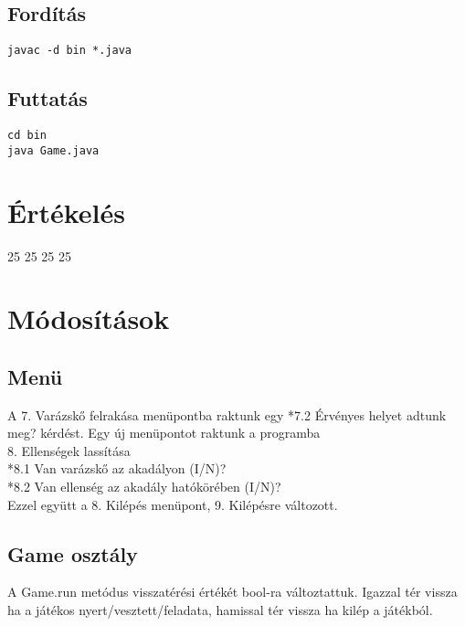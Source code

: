 \subsection{Fordítás}

\lstset{escapeinside=`', xleftmargin=10pt, frame=single, basicstyle=\ttfamily\footnotesize, language=sh}
\begin{lstlisting}
javac -d bin *.java
\end{lstlisting}

\subsection{Futtatás}

\lstset{escapeinside=`', xleftmargin=10pt, frame=single, basicstyle=\ttfamily\footnotesize, language=sh}
\begin{lstlisting}
cd bin
java Game.java
\end{lstlisting}

\section{Értékelés}

\begin{ertekeles}
{25}        %
{25}
{25}
{25}
\end{ertekeles}

\section{Módosítások}
\subsection{Menü}
A 7. Varázskő felrakása menüpontba raktunk egy *7.2 Érvényes helyet adtunk meg? kérdést.
Egy új menüpontot raktunk a programba \\
8. Ellenségek lassítása \\
*8.1 Van varázskő az akadályon (I/N)? \\
*8.2 Van ellenség az akadály hatókörében (I/N)? \\
Ezzel együtt a 8. Kilépés menüpont, 9. Kilépésre változott. \\

\subsection{Game osztály}
A Game.run metódus visszatérési értékét bool-ra változtattuk. Igazzal tér vissza ha a játékos nyert/vesztett/feladata, hamissal tér vissza ha kilép a játékból.

